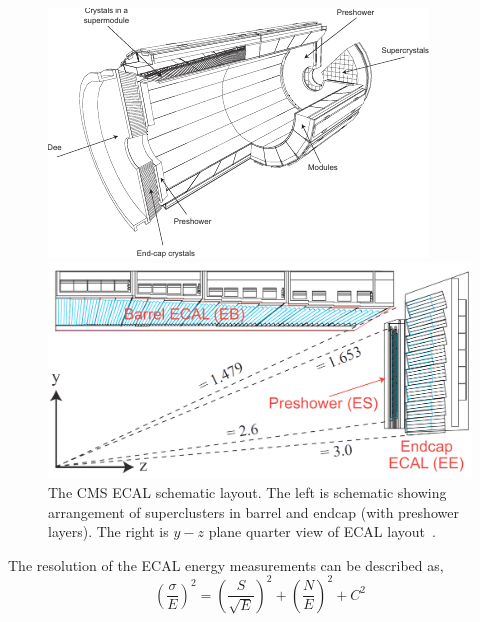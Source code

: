 \begin{figure}[!ht]
  \centering
  \begin{minipage}[c]{.60\textwidth}
    \includegraphics[width=\textwidth]{figures/cms_ecal_schematic.pdf}
  \end{minipage}
  \begin{minipage}[c]{.38\textwidth}
    \includegraphics[width=\textwidth]{figures/cms_ecal_layout.png}
  \end{minipage}
  \caption[The CMS \gls{ECAL} schematic layout]%
  {The \gls{CMS} \gls{ECAL} schematic layout. The left is schematic showing arrangement of
    superclusters in barrel and endcap (with preshower layers). The right is \(y-z \)
    plane quarter view of \gls{ECAL} layout~\cite{image-cms-ecal-layout}.}%
  \label{fig:cms-ecal-schematic}
\end{figure}

The resolution of the \gls{ECAL} energy measurements can be described as,
%
\begin{equation}
  {\left( \frac{\sigma}{E} \right)}^2
  = {\left( \frac{S}{\sqrt{E}} \right)}^2
  + {\left( \frac{N}{E} \right)}^2
  + C^2
\end{equation}

